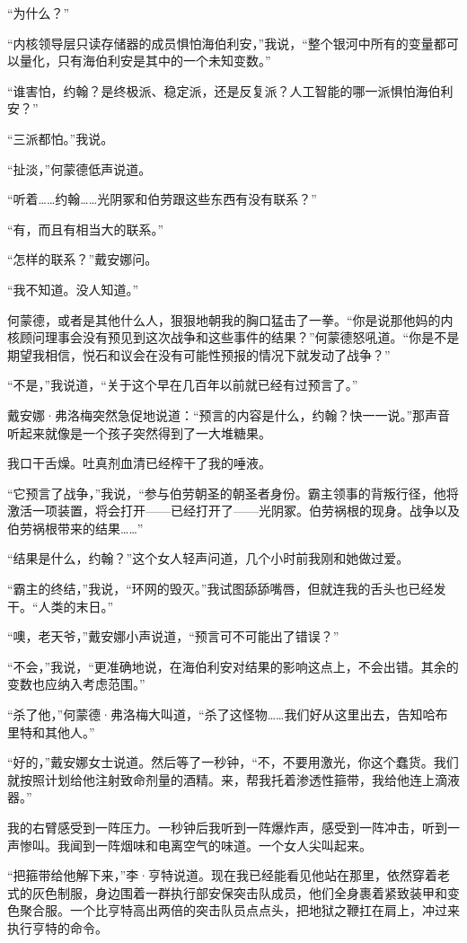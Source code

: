 \documentclass[AutoFakeBold=true]{book}
\begin{document}
``为什么？''

``内核领导层只读存储器的成员惧怕海伯利安，''我说，``整个银河中所有的变量都可以量化，只有海伯利安是其中的一个未知变数。''

``{\kaishu 谁}害怕，约翰？是终极派、稳定派，还是反复派？人工智能的哪一派惧怕海伯利安？''

``三派都怕。''我说。

``扯淡，''何蒙德低声说道。

``听着……约翰……光阴冢和伯劳跟这些东西有没有联系？''

``有，而且有相当大的联系。''

``怎样的联系？''戴安娜问。

``我不知道。没人知道。''

何蒙德，或者是其他什么人，狠狠地朝我的胸口猛击了一拳。``你是说那他妈的内核顾问理事会没有预见到这次战争和这些事件的结果？''何蒙德怒吼道。``你是不是期望我相信，悦石和议会在没有可能性预报的情况下就发动了战争？''

``不是，''我说道，``关于这个早在几百年以前就已经有过预言了。''

戴安娜·弗洛梅突然急促地说道：``预言的内容是什么，约翰？快一一说。''那声音听起来就像是一个孩子突然得到了一大堆糖果。

我口干舌燥。吐真剂血清已经榨干了我的唾液。

``它预言了战争，''我说，``参与伯劳朝圣的朝圣者身份。霸主领事的背叛行径，他将激活一项装置，将会打开——已经打开了——光阴冢。伯劳祸根的现身。战争以及伯劳祸根带来的结果……''

``结果是什么，约翰？''这个女人轻声问道，几个小时前我刚和她做过爱。

``霸主的终结，''我说，``环网的毁灭。''我试图舔舔嘴唇，但就连我的舌头也已经发干。``人类的末日。''

``噢，老天爷，''戴安娜小声说道，``预言可不可能出了错误？''

``不会，''我说，``更准确地说，在海伯利安对结果的影响这点上，不会出错。其余的变数也应纳入考虑范围。''

``杀了他，''何蒙德·弗洛梅大叫道，``杀了这怪物……我们好从这里出去，告知哈布里特和其他人。''

``好的，''戴安娜女士说道。然后等了一秒钟，``不，不要用激光，你这个蠢货。我们就按照计划给他注射致命剂量的酒精。来，帮我托着渗透性箍带，我给他连上滴液器。''

我的右臂感受到一阵压力。一秒钟后我听到一阵爆炸声，感受到一阵冲击，听到一声惨叫。我闻到一阵烟味和电离空气的味道。一个女人尖叫起来。

``把箍带给他解下来，''李·亨特说道。现在我已经能看见他站在那里，依然穿着老式的灰色制服，身边围着一群执行部安保突击队成员，他们全身裹着紧致装甲和变色聚合服。一个比亨特高出两倍的突击队员点点头，把地狱之鞭扛在肩上，冲过来执行亨特的命令。
\end{document}
